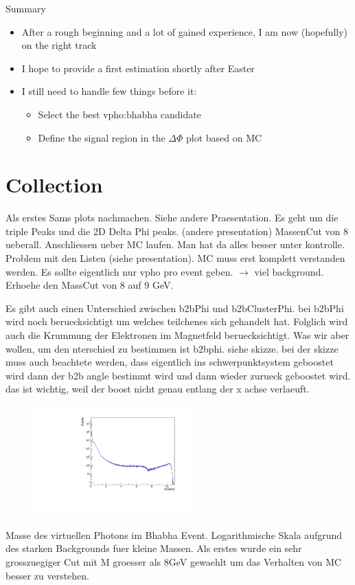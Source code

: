 \documentclass[10pt]{beamer}
\begin{document}
{\begin{frame}{Summary}
	\begin{itemize}
	\item After a rough beginning and a lot of gained experience, I am now (hopefully) on the right track 
	\item I hope to provide a first estimation shortly after Easter
	\item I still need to handle few things before it:
	\begin{itemize}
		\item Select the best $\textrm{vpho:bhabha}$ candidate
		\item Define the signal region in the $\Delta \Phi$ plot based on MC
	\end{itemize}
\end{itemize}
\end{frame}


\section{Collection}

\begin{frame}
Als erstes Sams plots nachmachen. Siehe andere Praesentation. Es geht um die triple Peaks und die 2D Delta Phi peaks. (andere presentation)
MassenCut von 8 ueberall.
Anschliessen ueber MC laufen. Man hat da alles besser unter kontrolle. Problem mit den Listen (siehe presentation).
MC muss erst komplett verstanden werden.
Es sollte eigentlich nur vpho pro event geben. $\rightarrow$ viel background. Erhoehe den MassCut von 8 auf 9 GeV. 

Es gibt auch einen Unterschied zwischen b2bPhi und b2bClusterPhi. bei b2bPhi wird noch beruecksichtigt um welches teilchenes sich gehandelt hat. Folglich wird auch die Krummung der Elektronen im Magnetfeld beruecksichtigt. Was wir aber wollen, um den nterschied zu bestimmen ist b2bphi. siehe skizze.
bei der skizze muss auch beachtete werden, dass eigentlich ins schwerpunktsystem geboostet wird dann der b2b angle bestimmt wird und dann wieder zurueck geboostet wird. das ist wichtig, weil der boost nicht genau entlang der x achse verlaeuft.
\end{frame}


\begin{frame}
	\begin{figure}
		\includegraphics[width=6cm]{Collection/MCMNoCuts}
	\end{figure}
Masse des virtuellen Photons im Bhabha Event. Logarithmische Skala aufgrund des starken Backgrounds fuer kleine Massen. Als erstes wurde ein sehr grosszuegiger Cut mit M groesser als 8GeV gewaehlt um das Verhalten von MC besser zu verstehen.


\end{frame}}
\end{document}
